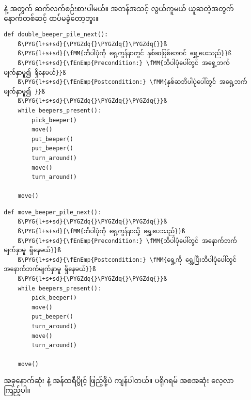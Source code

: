  နဲ့   အတွက် ဆက်လက်စဉ်းစားပါမယ်။ အတန်အသင့် လွယ်ကူမယ် ယူဆတဲ့အတွက် နောက်တစ်ဆင့် ထပ်မခွဲတော့ဘူး။
%
\setlength{\fboxsep}{0pt}
\begin{verbatim}
def double_beeper_pile_next():
    ß\PYG{l+s+sd}{\PYGZdq{}\PYGZdq{}\PYGZdq{}}ß
    ß\PYG{l+s+sd}{\fMM{ဘိပါပုံကို ရှေ့ကွန်နာတွင် နှစ်ဆဖြစ်အောင် ရွှေ့ပေးသည်}}ß
    ß\PYG{l+s+sd}{\fEnEmp{Precondition:} \fMM{ဘိပါပုံပေါ်တွင် အရှေ့ဘက် မျက်နှာမူ၍ ရှိနေမယ်}}ß
    ß\PYG{l+s+sd}{\fEnEmp{Postcondition:} \fMM{နှစ်ဆဘိပါပုံပေါ်တွင် အရှေ့ဘက် မျက်နှာမူ၍ }}ß
    ß\PYG{l+s+sd}{\PYGZdq{}\PYGZdq{}\PYGZdq{}}ß
    while beepers_present():
        pick_beeper()
        move()
        put_beeper()
        put_beeper()
        turn_around()
        move()
        turn_around()

    move()
\end{verbatim}
%
\betweenminted{\medskipamount}
%
\setlength{\fboxsep}{0pt}
\begin{verbatim}
def move_beeper_pile_next():
    ß\PYG{l+s+sd}{\PYGZdq{}\PYGZdq{}\PYGZdq{}}ß
    ß\PYG{l+s+sd}{\fMM{ဘိပါပုံကို ရှေ့ကွန်နာသို့ ရွှေ့ပေးသည်}}ß
    ß\PYG{l+s+sd}{\fEnEmp{Precondition:} \fMM{ဘိပါပုံပေါ်တွင် အနောက်ဘက်မျက်နှာမူ ရှိနေမယ်}}ß
    ß\PYG{l+s+sd}{\fEnEmp{Postcondition:} \fMM{ရှေ့ကို ရွှေ့ပြီးဘိပါပုံပေါ်တွင် အနောက်ဘက်မျက်နှာမူ ရှိနေမယ်}}ß
    ß\PYG{l+s+sd}{\PYGZdq{}\PYGZdq{}\PYGZdq{}}ß
    while beepers_present():
        pick_beeper()
        move()
        put_beeper()
        turn_around()
        move()
        turn_around()

    move()
\end{verbatim}
%
အခုနောက်ဆုံး \fEn{,}  နဲ့ အန်ထရီပွိုင့် ဖြည့်ဖို့ပဲ ကျန်ပါတယ်။ ပရိုဂရမ် အစအဆုံး လေ့လာကြည့်ပါ။ 
%
\setlength{\fboxsep}{0pt}
